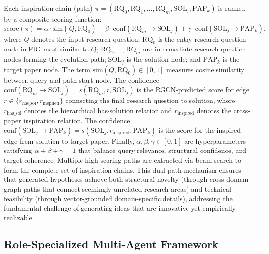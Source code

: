 \documentclass[runningheads]{llncs}
\begin{document}
Each inspiration chain (path) $\pi = (\text{RQ}_0, \text{RQ}_1, \ldots, \text{RQ}_m, \text{SOL}_j, \text{PAP}_k)$ is ranked by a composite scoring function:
\begin{equation}
    \text{score}(\pi) = \alpha \cdot \text{sim}(Q, \text{RQ}_0) + \beta \cdot \text{conf}(\text{RQ}_m \rightarrow \text{SOL}_j) + \gamma \cdot \text{conf}(\text{SOL}_j \rightarrow \text{PAP}_k),
    \label{eq:score}
\end{equation}
where $Q$ denotes the input research question; $\text{RQ}_0$ is the entry research question node in FIG most similar to $Q$; $\text{RQ}_1, \ldots, \text{RQ}_m$ are intermediate research question nodes forming the evolution path; $\text{SOL}_j$ is the solution node; and $\text{PAP}_k$ is the target paper node. The term $\text{sim}(Q, \text{RQ}_0) \in [0, 1]$ measures cosine similarity between query and path start node. The confidence $\text{conf}(\text{RQ}_m \rightarrow \text{SOL}_j) = s(\text{RQ}_m, r, \text{SOL}_j)$ is the RGCN-predicted score for edge $r \in \{r_{\text{has\_sol}}, r_{\text{inspired}}\}$ connecting the final research question to solution, where $r_{\text{has\_sol}}$ denotes the hierarchical has-solution relation and $r_{\text{inspired}}$ denotes the cross-paper inspiration relation. The confidence $\text{conf}(\text{SOL}_j \rightarrow \text{PAP}_k) = s(\text{SOL}_j, r_{\text{inspired}}, \text{PAP}_k)$ is the score for the inspired edge from solution to target paper. Finally, $\alpha, \beta, \gamma \in [0, 1]$ are hyperparameters satisfying $\alpha + \beta + \gamma = 1$ that balance query relevance, structural confidence, and target coherence. Multiple high-scoring paths are extracted via beam search to form the complete set of inspiration chains. This dual-path mechanism ensures that generated hypotheses achieve both structural novelty (through cross-domain graph paths that connect seemingly unrelated research areas) and technical feasibility (through vector-grounded domain-specific details), addressing the fundamental challenge of generating ideas that are innovative yet empirically realizable.

\subsection{Role-Specialized Multi-Agent Framework}
\label{sec:workflow}
\end{document}

